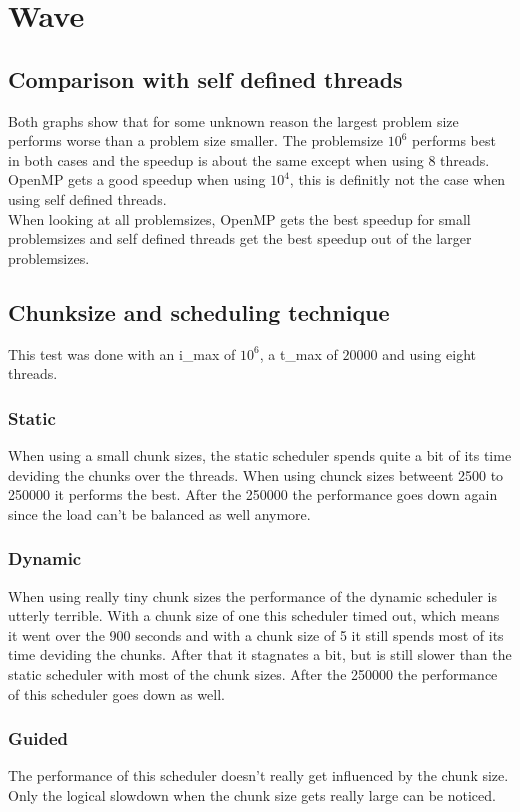 \documentclass[12pt]{article}
\begin{document}
\maketitle
\section{Wave}
\subsection{Comparison with self defined threads}
Both graphs show that for some unknown reason the largest problem size performs
worse than a problem size smaller. The problemsize $10^6$ performs best in both
cases and the speedup is about the same except when using 8 threads.\\
OpenMP gets a good speedup when using $10^4$, this is definitly not the case
when using self defined threads.\\
When looking at all problemsizes, OpenMP gets the best speedup for small
problemsizes and self defined threads get the best speedup out of the larger
problemsizes.
\subsection{Chunksize and scheduling technique}
This test was done with an i\_max of $10^6$, a t\_max of $20000$ and using eight threads.
\subsubsection{Static}
When using a small chunk sizes, the static scheduler spends quite a bit of its
time deviding the chunks over the threads. When using chunck sizes betweent
2500 to 250000 it performs the best. After the 250000 the performance goes down
again since the load can't be balanced as well anymore.
\subsubsection{Dynamic}
When using really tiny chunk sizes the performance of the dynamic scheduler is
utterly terrible. With a chunk size of one this scheduler timed out, which
means it went over the 900 seconds and with a chunk size of 5 it still spends
most of its time deviding the chunks. After that it stagnates a bit, but is
still slower than the static scheduler with most of the chunk sizes. After the
250000 the performance of this scheduler goes down as well.

\subsubsection{Guided}
The performance of this scheduler doesn't really get influenced by the chunk
size. Only the logical slowdown when the chunk size gets really large can be
noticed.
\end{document}
